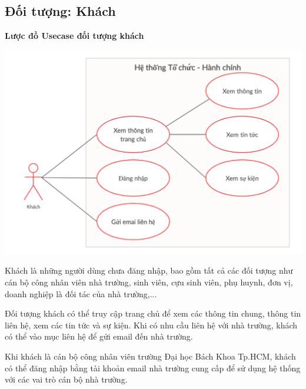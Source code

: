 \subsection{Đối tượng: Khách}
\textbf{Lược đồ Usecase đối tượng khách}
\begin{center}
  \captionsetup{type=figure}
  \includegraphics[width=14cm]{img/usecase/guest.png}
\end{center}

Khách là những người dùng chưa đăng nhập, bao gồm tất cả các đối tượng như cán bộ công nhân viên nhà trường, sinh viên, cựu sinh viên, phụ huynh, đơn vị, doanh nghiệp là đối tác của nhà trường,...
 
 Đối tượng khách có thể truy cập trang chủ để xem các thông tin chung, thông tin liên hệ, xem các tin tức và sự kiện. Khi có nhu cầu liên hệ với nhà trường, khách có thể vào mục liên hệ để gửi email đến nhà trường.
 
 Khi khách là cán bộ công nhân viên trường Đại học Bách Khoa Tp.HCM, khách có thể đăng nhập bằng tài khoản email nhà trường cung cấp để sử dụng hệ thống với các vai trò cán bộ nhà trường.

